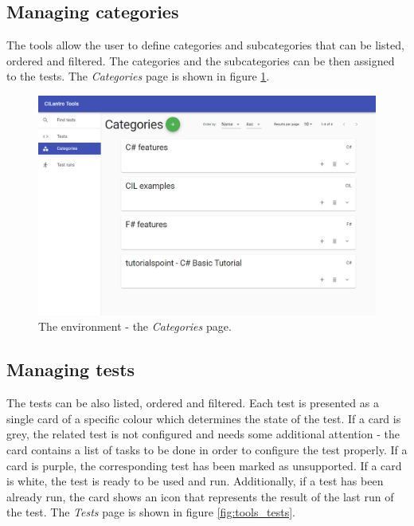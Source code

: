 \documentclass[declaration,shortabstract,english,mgr]{iithesis}
\begin{document}
\subsection{Managing categories}

The tools allow the user to define categories and subcategories that can be listed, ordered and filtered. The categories and the subcategories can be then assigned to the tests. The \textit{Categories} page is shown in figure \ref{fig:tools_categories}.

\begin{figure}
	\includegraphics[width=1\textwidth]{tools_categories.png}
    \centering
    \caption{The environment - the \textit{Categories} page.}
    \label{fig:tools_categories}
\end{figure}

\subsection{Managing tests}

The tests can be also listed, ordered and filtered. Each test is presented as a single card of a specific colour which determines the state of the test. If a card is grey, the related test is not configured and needs some additional attention - the card contains a list of tasks to be done in order to configure the test properly. If a card is purple, the corresponding test has been marked as unsupported. If a card is white, the test is ready to be used and run. Additionally, if a test has been already run, the card shows an icon that represents the result of the last run of the test. The \textit{Tests} page is shown in figure \ref{fig:tools_tests}.
\end{document}
